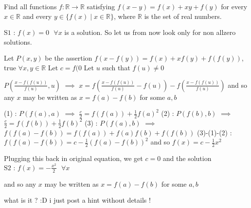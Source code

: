 \begin{solution}
	\begin{tcolorbox}Find all functions $f:\mathbb{R}\to \mathbb{R}$ satisfying $f(x-y)=f(x)+xy+f(y)$ for every $x \in \mathbb{R}$ and every $y \in \{f(x) \mid x\in \mathbb{R}\}$, where $\mathbb{R}$ is the set of real numbers.\end{tcolorbox}
$\boxed{\text{S1 : }f(x)=0\text{   }\forall x}$ is a solution. So let us from now look only for non allzero solutions.

Let $P(x,y)$ be the assertion $f(x-f(y))=f(x)+xf(y)+f(f(y))$, true $\forall x,y\in\mathbb R$
Let $c=f(0$
Let $u$ such that $f(u)\ne 0$

$P(\frac{x-f(f(u))}{f(u)},u)$ $\implies$ $x=f(\frac{x-f(f(u))}{f(u)}-f(u))-f(\frac{x-f(f(u))}{f(u)})$ and so any $x$ may be written as $x=f(a)-f(b)$ for some $a,b$

(1) : $P(f(a),a)$ $\implies$ $\frac c2=f(f(a))+\frac 12f(a)^2$
(2) : $P(f(b),b)$ $\implies$ $\frac c2=f(f(b))+\frac 12f(b)^2$
(3) : $P(f(a),b)$ $\implies$ $f(f(a)-f(b))=f(f(a))+f(a)f(b)+f(f(b))$
(3)-(1)-(2) : $f(f(a)-f(b))=c-\frac 12(f(a)-f(b))^2$ and so $f(x)=c-\frac 12x^2$

Plugging this back in original equation, we get $c=0$ and the solution $\boxed{\text{S2 : }f(x)=-\frac{x^2}2\text{   }\forall x}$
\end{solution}



\begin{solution}
	\begin{tcolorbox} and so any $x$ may be written as $x=f(a)-f(b)$ for some $a,b$
\end{tcolorbox}

what is it ? :D  i just post a hint without details !  
\end{solution}






